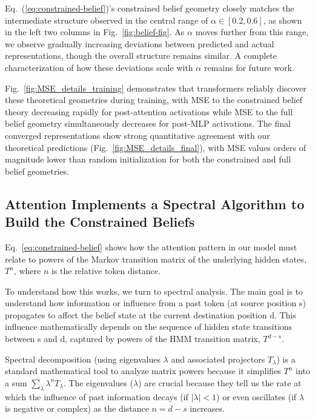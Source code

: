 \documentclass{article}
\theoremstyle{plain}
\theoremstyle{definition}
\theoremstyle{remark}
\begin{document}
Eq.~(\ref{eq:constrained-belief})'s constrained belief geometry
closely matches the intermediate structure observed in the central range of $\alpha \in [0.2, 0.6]$,
as shown in the left two columns in Fig.~\ref{fig:belief-fig}. 
As $\alpha$ moves further from this range, we observe gradually increasing deviations between predicted and actual representations, though the overall structure remains similar. A complete characterization of how these deviations scale with $\alpha$ remains for future work.

Fig.~\ref{fig:MSE_details_training} demonstrates that transformers reliably discover these theoretical geometries during training, with MSE to the constrained belief theory decreasing rapidly for post-attention activations while MSE to the full belief geometry simultaneously decreases for post-MLP activations. The final converged representations show strong quantitative agreement with our theoretical predictions (Fig.~\ref{fig:MSE_details_final}), with MSE values orders of magnitude lower than random initialization for both the constrained and full belief geometries.



\subsection{Attention Implements a Spectral Algorithm to Build the Constrained Beliefs}
\label{Eigenvalues}



Eq.~\eqref{eq:constrained-belief} shows how the attention pattern in our model must relate to powers of the Markov transition matrix of the underlying hidden states, $T^n$, where $n$ is the relative token distance. 


To understand  how this works, we turn to spectral analysis. The main goal is to understand how information or influence from a past token (at source position s) propagates to affect the belief state at the current destination position d. This influence mathematically depends on the sequence of hidden state transitions between s and d, captured by powers of the HMM transition matrix, $T^{d-s}$.

Spectral decomposition (using eigenvalues $\lambda$ and associated projectors $T_\lambda$) is a standard mathematical tool to analyze matrix powers because it simplifies $T^n$ into a sum $\sum_\lambda \lambda^n T_\lambda$. The eigenvalues ($\lambda$) are crucial because they tell us the rate at which the influence of past information decays (if $|\lambda|<1$) or even oscillates (if $\lambda$ is negative or complex) as the distance $n=d-s$ increases.
\end{document}
